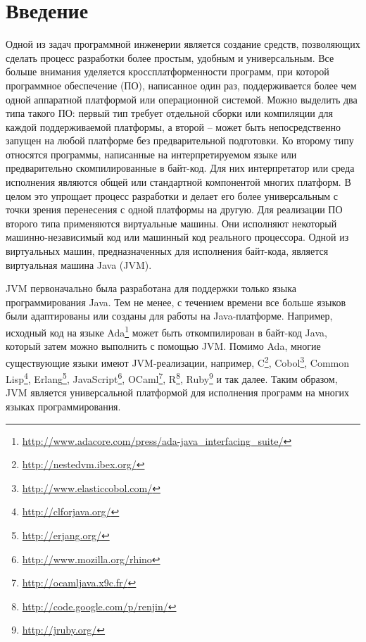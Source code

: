 \documentclass[14pt]{extarticle}
\begin{document}
\fi

\section*{Введение}
\sloppy
Одной из задач программной инженерии является создание средств, позволяющих сделать процесс разработки более простым, удобным и универсальным. Все больше внимания уделяется кроссплатформенности программ, при которой программное обеспечение (ПО), написанное один раз, поддерживается более чем одной аппаратной платформой или операционной системой. Можно выделить два типа такого ПО: первый тип требует отдельной сборки или компиляции для каждой поддерживаемой платформы, а второй – может быть непосредственно запущен на любой платформе без предварительной подготовки. Ко второму типу относятся программы, написанные на интерпретируемом языке или предварительно скомпилированные в байт-код. Для них интерпретатор или среда исполнения являются общей или стандартной компонентой многих платформ. В целом это упрощает процесс разработки и делает его более универсальным с точки зрения перенесения с одной платформы на другую.
Для реализации ПО второго типа применяются виртуальные машины. Они исполняют некоторый машинно-независимый код или машинный код реального процессора. Одной из виртуальных машин, предназначенных для исполнения байт-кода, является виртуальная машина Java (JVM)\cite{jvms}.

JVM первоначально была разработана для поддержки только языка программирования Java. Тем не менее, с течением времени все больше языков были адаптированы или созданы  для работы на Java-платформе. Например, исходный код на языке Ada\footnote{\url{http://www.adacore.com/press/ada-java_interfacing_suite/}} может быть откомпилирован в байт-код Java, который затем можно выполнить с помощью JVM. Помимо Ada, многие существующие языки имеют JVM-реализации, например, C\footnote{\url{http://nestedvm.ibex.org/}}, Cobol\footnote{\url{http://www.elasticcobol.com/}}, Common Lisp\footnote{\url{http://clforjava.org/}}, Erlang\footnote{\url{http://erjang.org/}}, JavaScript\footnote{\url{http://www.mozilla.org/rhino}}, OCaml\footnote{\url{http://ocamljava.x9c.fr/}}, R\footnote{\url{http://code.google.com/p/renjin/}}, Ruby\footnote{\url{http://jruby.org/}} и так далее. Таким образом, JVM является универсальной платформой для исполнения программ на многих языках программирования. 
\end{document}
